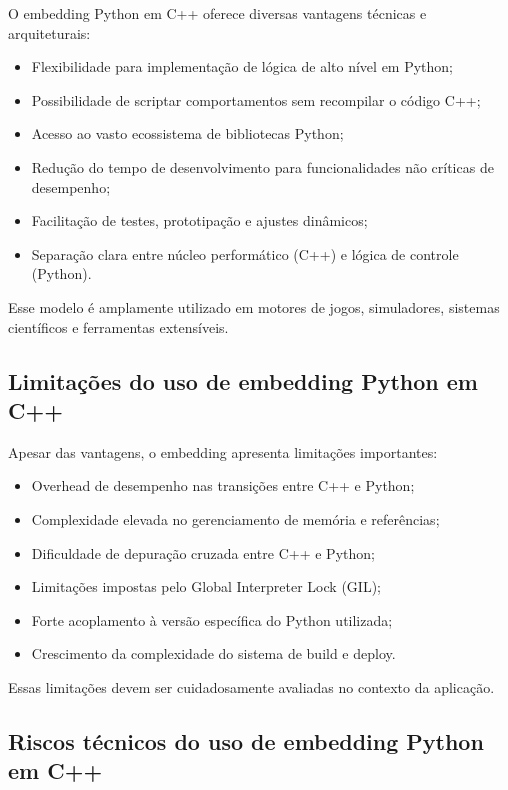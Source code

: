 O embedding Python em C++ oferece diversas vantagens técnicas e arquiteturais:

\begin{itemize}
    \item Flexibilidade para implementação de lógica de alto nível em Python;
    \item Possibilidade de scriptar comportamentos sem recompilar o código C++;
    \item Acesso ao vasto ecossistema de bibliotecas Python;
    \item Redução do tempo de desenvolvimento para funcionalidades não críticas de desempenho;
    \item Facilitação de testes, prototipação e ajustes dinâmicos;
    \item Separação clara entre núcleo performático (C++) e lógica de controle (Python).
\end{itemize}

Esse modelo é amplamente utilizado em motores de jogos, simuladores, sistemas científicos e ferramentas extensíveis.

\subsection{Limitações do uso de embedding Python em C++}

Apesar das vantagens, o embedding apresenta limitações importantes:

\begin{itemize}
    \item Overhead de desempenho nas transições entre C++ e Python;
    \item Complexidade elevada no gerenciamento de memória e referências;
    \item Dificuldade de depuração cruzada entre C++ e Python;
    \item Limitações impostas pelo Global Interpreter Lock (GIL);
    \item Forte acoplamento à versão específica do Python utilizada;
    \item Crescimento da complexidade do sistema de build e deploy.
\end{itemize}

Essas limitações devem ser cuidadosamente avaliadas no contexto da aplicação.

\subsection{Riscos técnicos do uso de embedding Python em C++}

